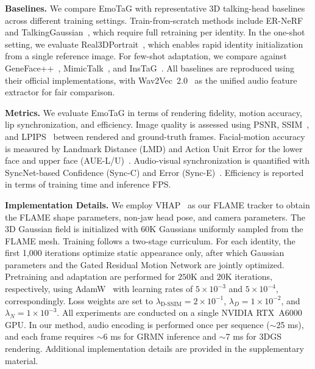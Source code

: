\noindent \textbf{Baselines.}
We compare EmoTaG with representative 3D talking-head baselines across different training settings.
Train-from-scratch methods include ER-NeRF~\cite{li2023efficient} and TalkingGaussian~\cite{li2024talkinggaussian}, which require full retraining per identity.
In the one-shot setting, we evaluate Real3DPortrait~\cite{ye2024real3d}, which enables rapid identity initialization from a single reference image.
For few-shot adaptation, we compare against GeneFace++~\cite{ye2023geneface++}, MimicTalk~\cite{ye2024mimictalk}, and InsTaG~\cite{li2025instag}.
All baselines are reproduced using their official implementations, with Wav2Vec~2.0~\cite{baevski2020wav2vec} as the unified audio feature extractor for fair comparison.

\noindent \textbf{Metrics.}
We evaluate EmoTaG in terms of rendering fidelity, motion accuracy, lip synchronization, and efficiency.
Image quality is assessed using PSNR, SSIM~\cite{wang2004image}, and LPIPS~\cite{zhang2018unreasonable} between rendered and ground-truth frames.
Facial-motion accuracy is measured by Landmark Distance (LMD) and Action Unit Error for the lower face and upper face (AUE-L/U)~\cite{ekman1978facial, li2024talkinggaussian}.
Audio-visual synchronization is quantified with SyncNet-based Confidence (Sync-C) and Error (Sync-E)~\cite{chung2016lip, chung2016out}.
Efficiency is reported in terms of training time and inference FPS.

\noindent \textbf{Implementation Details.}
We employ VHAP~\cite{qian2024vhap} as our FLAME tracker to obtain the FLAME shape parameters, non-jaw head pose, and camera parameters. The 3D Gaussian field is initialized with 60K Gaussians uniformly sampled from the FLAME mesh. Training follows a two-stage curriculum. For each identity, the first 1,000 iterations optimize static appearance only, after which Gaussian parameters and the Gated Residual Motion Network are jointly optimized. Pretraining and adaptation are performed for $250$K and $20$K iterations, respectively, using AdamW~\cite{loshchilov2017decoupled} with learning rates of $5{\times}10^{-3}$ and $5{\times}10^{-4}$, correspondingly. Loss weights are set to $\lambda_{\text{D-SSIM}}{=}2{\times}10^{-1}$, $\lambda_{D}{=}1{\times}10^{-2}$, and $\lambda_{N}{=}1{\times}10^{-3}$. All experiments are conducted on a single NVIDIA RTX~A6000 GPU. In our method, audio encoding is performed once per sequence ($\sim$25 ms), and each frame requires $\sim$6 ms for GRMN inference and $\sim$7 ms for 3DGS rendering. Additional implementation details are provided in the supplementary material.

